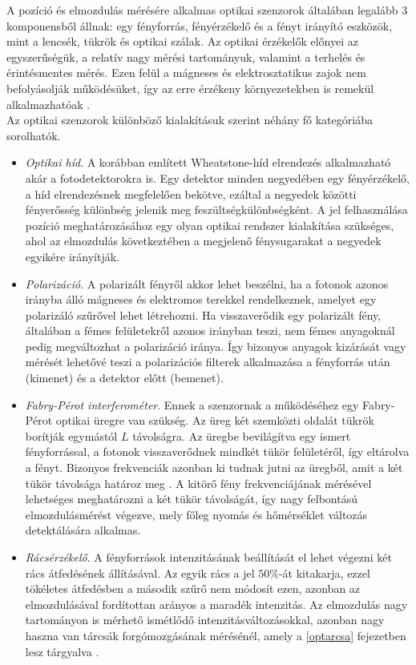 A pozíció és elmozdulás mérésére alkalmas optikai szenzorok általában legalább 3 komponensből állnak: egy fényforrás, fényérzékelő és a fényt irányító eszközök, mint a lencsék, tükrök és optikai szálak. Az optikai érzékelők előnyei az egyszerűségük, a relatív nagy mérési tartományuk, valamint a terhelés és érintésmentes mérés. Ezen felül a mágneses és elektrosztatikus zajok nem befolyásolják működésüket, így az erre érzékeny környezetekben is remekül alkalmazhatóak \cite{Fraden2016a}.\\
Az optikai szenzorok különböző kialakításuk szerint néhány fő kategóriába sorolhatók.
\begin{itemize}
	\item \textit{Optikai híd}. A korábban említett Wheatstone-híd elrendezés alkalmazható akár a fotodetektorokra is. Egy detektor minden negyedében egy fényérzékelő, a híd elrendezésnek megfelelően bekötve, ezáltal a negyedek közötti fényerősség különbség jelenik meg feszültségkülönbségként. A jel felhasználása pozíció meghatározásához egy olyan optikai rendszer kialakítása szükséges, ahol az elmozdulás következtében a megjelenő fénysugarakat a negyedek egyikére irányítják.
	\item \textit{Polarizáció}. A polarizált fényről akkor lehet beszélni, ha a fotonok azonos irányba álló mágneses és elektromos terekkel rendelkeznek, amelyet egy polarizáló szűrővel lehet létrehozni. Ha visszaverődik egy polarizált fény, általában a fémes felületekről azonos irányban teszi, nem fémes anyagoknál pedig megváltozhat a polarizáció iránya. Így bizonyos anyagok kizárását vagy mérését lehetővé teszi a polarizációs filterek alkalmazása a fényforrás után (kimenet) és a detektor előtt (bemenet).
	\item \textit{Fabry-Pérot interferométer}. Ennek a szenzornak a működéséhez egy Fabry-Pérot optikai üregre van szükség. Az üreg két szemközti oldalát tükrök borítják egymástól $L$ távolságra. Az üregbe bevilágítva egy ismert fényforrással, a fotonok visszaverődnek mindkét tükör felületéről, így eltárolva a fényt. Bizonyos frekvenciák azonban ki tudnak jutni az üregből, amit a két tükör távolsága határoz meg \cite{Fraden2016a}. A kitörő fény frekvenciájának mérésével lehetséges meghatározni a két tükör távolságát, így nagy felbontású elmozdulásmérést végezve, mely főleg nyomás és hőmérséklet változás detektálására alkalmas.
	\item \textit{Rácsérzékelő}. A fényforrások intenzitásának beállítását el lehet végezni két rács átfedésének állításával. Az egyik rács a jel $50\%$-át kitakarja, ezzel tökéletes átfedésben a második szűrő nem módosít ezen, azonban az elmozdulásával fordítottan arányos a maradék intenzitás. Az elmozdulás nagy tartományon is mérhető ismétlődő intenzitásváltozásokkal, azonban nagy haszna van tárcsák forgómozgásának mérésénél, amely a \ref{optarcsa} fejezetben lesz tárgyalva \cite{Fraden2016a}.

\end{itemize}
